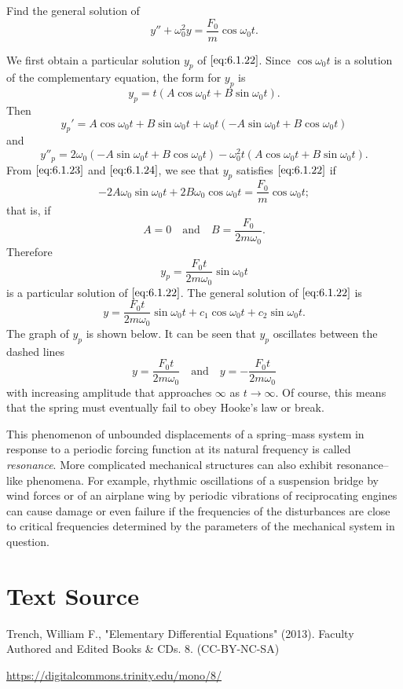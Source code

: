 \documentclass{ximera}
\begin{document}
 
 
\begin{example}\label{example:6.1.5}
Find the general solution of
\begin{equation}\label{eq:6.1.22}
y''+\omega_0^2y=\frac{F_0}{m}\cos\omega_0t.
\end{equation}
 
\begin{explanation}
We first obtain a particular solution $y_p$ of $\eqref{eq:6.1.22}$. Since
$\cos\omega_0t$ is a solution of the complementary equation, the form
for $y_p$ is
\begin{equation}\label{eq:6.1.23}
y_p=t(A\cos\omega_0t+B\sin\omega_0t).
\end{equation}
 Then
$$
y_p'=A\cos\omega_0t+B\sin\omega_0t
+\omega_0t(-A\sin\omega_0t+B\cos\omega_0t)
$$
and
\begin{equation}\label{eq:6.1.24}
y''_p=2\omega_0(-A\sin\omega_0t
+B\cos\omega_0t)-\omega_0^2t(A\cos\omega_0t+B\sin\omega_0t).
\end{equation}
From $\eqref{eq:6.1.23}$ and $\eqref{eq:6.1.24}$, we see that $y_p$ satisfies
$\eqref{eq:6.1.22}$ if
$$
-2A\omega_0\sin\omega_0t+2B\omega_0\cos\omega_0t=\frac{F_0}{m}
\cos\omega_0t;
$$
that is, if
$$
A=0\quad\mbox{and}\quad B=\frac{F_0}{2m\omega_0}.
$$
Therefore
$$
y_p=\frac{F_0t}{2m\omega_0}\sin\omega_0t
$$
is a particular solution of $\eqref{eq:6.1.22}$. The general solution of
$\eqref{eq:6.1.22}$ is
$$
y=\frac{F_0t}{2m\omega_0}\sin\omega_0t+c_1\cos\omega_0t+c_2\sin\omega_0t.
$$
The graph of $y_p$ is shown below.  It can be
seen that $y_p$ oscillates between the dashed lines
$$
y=\frac{F_0t}{2m\omega_0}\quad\mbox{and}\quad y=-\frac{F_0t}{2m\omega_0}
$$
with increasing amplitude that approaches $\infty$ as $t\rightarrow\infty$. Of
course, this means that the spring must eventually fail to obey Hooke's law
or break.

\begin{center}
\end{center}

\end{explanation}
\end{example}
 
 
 
This phenomenon of unbounded displacements of a spring--mass system in
response to a periodic forcing function at its natural
frequency is called \textit{resonance}. More complicated mechanical
structures can also exhibit resonance--like phenomena. For example,
rhythmic oscillations of a suspension bridge by wind forces or of an
airplane wing by periodic vibrations of reciprocating engines can
cause damage or even failure if the frequencies of the disturbances
are close to critical frequencies determined by the parameters of the
mechanical system in question.
 
\section*{Text Source}
Trench, William F., "Elementary Differential Equations" (2013). Faculty Authored and Edited Books \& CDs. 8. (CC-BY-NC-SA)
 
\href{https://digitalcommons.trinity.edu/mono/8/}{https://digitalcommons.trinity.edu/mono/8/}
 
\end{document}
